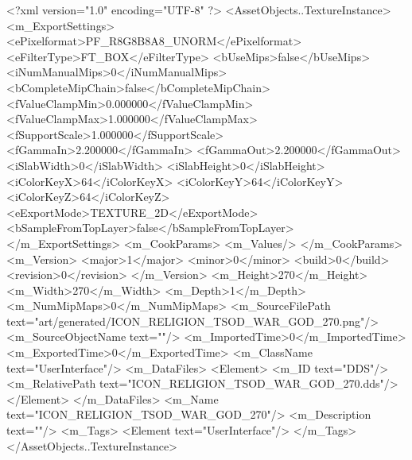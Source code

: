<?xml version="1.0" encoding="UTF-8" ?>
<AssetObjects..TextureInstance>
	<m_ExportSettings>
		<ePixelformat>PF_R8G8B8A8_UNORM</ePixelformat>
		<eFilterType>FT_BOX</eFilterType>
		<bUseMips>false</bUseMips>
		<iNumManualMips>0</iNumManualMips>
		<bCompleteMipChain>false</bCompleteMipChain>
		<fValueClampMin>0.000000</fValueClampMin>
		<fValueClampMax>1.000000</fValueClampMax>
		<fSupportScale>1.000000</fSupportScale>
		<fGammaIn>2.200000</fGammaIn>
		<fGammaOut>2.200000</fGammaOut>
		<iSlabWidth>0</iSlabWidth>
		<iSlabHeight>0</iSlabHeight>
		<iColorKeyX>64</iColorKeyX>
		<iColorKeyY>64</iColorKeyY>
		<iColorKeyZ>64</iColorKeyZ>
		<eExportMode>TEXTURE_2D</eExportMode>
		<bSampleFromTopLayer>false</bSampleFromTopLayer>
	</m_ExportSettings>
	<m_CookParams>
		<m_Values/>
	</m_CookParams>
	<m_Version>
		<major>1</major>
		<minor>0</minor>
		<build>0</build>
		<revision>0</revision>
	</m_Version>
	<m_Height>270</m_Height>
	<m_Width>270</m_Width>
	<m_Depth>1</m_Depth>
	<m_NumMipMaps>0</m_NumMipMaps>
	<m_SourceFilePath text="art/generated/ICON_RELIGION_TSOD_WAR_GOD_270.png"/>
	<m_SourceObjectName text=""/>
	<m_ImportedTime>0</m_ImportedTime>
	<m_ExportedTime>0</m_ExportedTime>
	<m_ClassName text="UserInterface"/>
	<m_DataFiles>
		<Element>
			<m_ID text="DDS"/>
			<m_RelativePath text="ICON_RELIGION_TSOD_WAR_GOD_270.dds"/>
		</Element>
	</m_DataFiles>
	<m_Name text="ICON_RELIGION_TSOD_WAR_GOD_270"/>
	<m_Description text=""/>
	<m_Tags>
		<Element text="UserInterface"/>
	</m_Tags>
</AssetObjects..TextureInstance>
